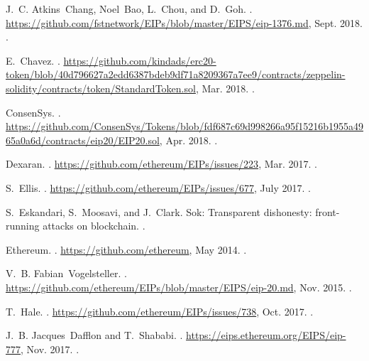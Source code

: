 \begin{thebibliography}{10}
\footnotesize

J.~C. Atkins~Chang, Noel~Bao, L.~Chou, and D.~Goh.
.
\newblock
  \url{https://github.com/fstnetwork/EIPs/blob/master/EIPS/eip-1376.md}, Sept.
  2018.
.

E.~Chavez.
.
\newblock
  \url{https://github.com/kindads/erc20-token/blob/40d796627a2edd6387bdeb9df71a8209367a7ee9/contracts/zeppelin-solidity/contracts/token/StandardToken.sol},
  Mar. 2018.
.

ConsenSys.
.
\newblock
  \url{https://github.com/ConsenSys/Tokens/blob/fdf687c69d998266a95f15216b1955a4965a0a6d/contracts/eip20/EIP20.sol},
  Apr. 2018.
.

Dexaran.
.
\newblock \url{https://github.com/ethereum/EIPs/issues/223}, Mar. 2017.
.

S.~Ellis.
.
\newblock \url{https://github.com/ethereum/EIPs/issues/677}, July 2017.
.

S.~Eskandari, S.~Moosavi, and J.~Clark.
\newblock Sok: Transparent dishonesty: front-running attacks on blockchain.
.

Ethereum.
.
\newblock \url{https://github.com/ethereum}, May 2014.
.

V.~B. Fabian~Vogelsteller.
.
\newblock \url{https://github.com/ethereum/EIPs/blob/master/EIPS/eip-20.md},
  Nov. 2015.
.

T.~Hale.
.
\newblock \url{https://github.com/ethereum/EIPs/issues/738}, Oct. 2017.
.

J.~B. Jacques~Dafflon and T.~Shababi.
.
\newblock \url{https://eips.ethereum.org/EIPS/eip-777}, Nov. 2017.
.


\end{thebibliography}
